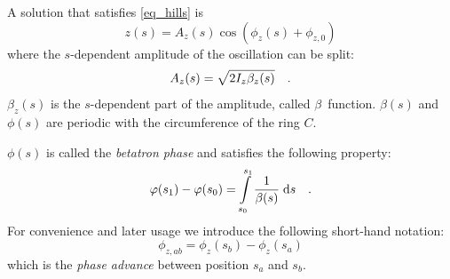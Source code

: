 A solution that satisfies \eqref{eq_hills} is
%
\begin{equation}
    z(s) = A_z(s) \cos\left(\phi_z(s) + \phi_{z,0} \right)
    \label{eq_betatron_osc}
\end{equation}
%
where the $s$-dependent amplitude of the oscillation can be split:
%
\begin{equation}
    A_z(s) = \sqrt{2I_z \beta_z(s)}
    \quad .
    \label{eq_betatron_ampl}
\end{equation}
%
$\beta_z(s)$ is the $s$-dependent part of the amplitude, called $\beta$~function.
$\beta(s)$ and $\phi(s)$ are periodic with the circumference of the ring $C$.

$\phi(s)$ is called the \emph{betatron phase} and satisfies the following property:
%
\begin{equation}
    \varphi(s_1) - \varphi(s_0) = \int\limits_{s_0}^{s_1} \frac{1}{\beta(s)}\;\text{d} s
    \quad .
    \label{eq_phase}
\end{equation}
%
For convenience and later usage we introduce the following short-hand notation:
%
\begin{equation}
    \phi_{z,ab} = \phi_z(s_b) - \phi_z(s_a)
\end{equation}
%
which is the \emph{phase advance} between position $s_a$ and $s_b$.

